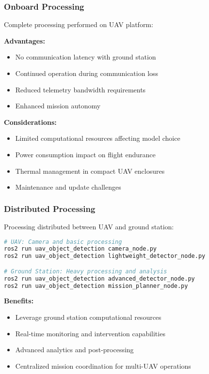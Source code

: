 \documentclass[12pt,a4paper]{article}
\begin{document}
\subsubsection{Onboard Processing}

Complete processing performed on UAV platform:

\textbf{Advantages:}
\begin{itemize}
    \item No communication latency with ground station
    \item Continued operation during communication loss
    \item Reduced telemetry bandwidth requirements
    \item Enhanced mission autonomy
\end{itemize}

\textbf{Considerations:}
\begin{itemize}
    \item Limited computational resources affecting model choice
    \item Power consumption impact on flight endurance
    \item Thermal management in compact UAV enclosures
    \item Maintenance and update challenges
\end{itemize}

\subsubsection{Distributed Processing}

Processing distributed between UAV and ground station:

\begin{lstlisting}[language=bash, caption=Distributed Deployment Example]
# UAV: Camera and basic processing
ros2 run uav_object_detection camera_node.py
ros2 run uav_object_detection lightweight_detector_node.py

# Ground Station: Heavy processing and analysis
ros2 run uav_object_detection advanced_detector_node.py
ros2 run uav_object_detection mission_planner_node.py
\end{lstlisting}

\textbf{Benefits:}
\begin{itemize}
    \item Leverage ground station computational resources
    \item Real-time monitoring and intervention capabilities
    \item Advanced analytics and post-processing
    \item Centralized mission coordination for multi-UAV operations
\end{itemize}
\end{document}
